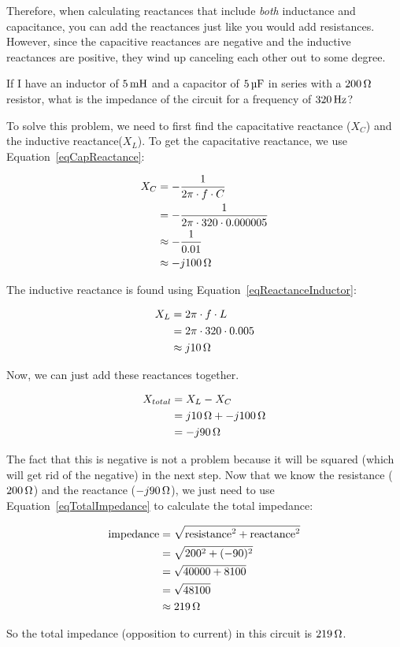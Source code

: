 Therefore, when calculating reactances that include \emph{both} inductance and capacitance, you can add the reactances just like you would add resistances.
However, since the capacitive reactances are negative and the inductive reactances are positive, they wind up canceling each other out to some degree.

\begin{exampleprob}
If I have an inductor of $5\mymhy$ and a capacitor of $5\,\si{\micro\farad}$ in series with a $200\,\si{\ohm}$ resistor, what is the impedance of the circuit for a frequency of $320\,\si{\hertz}$?

To solve this problem, we need to first find the capacitative reactance ($X_C$) and the inductive reactance($X_L$).
To get the capacitative reactance, we use Equation~\ref{eqCapReactance}:

\begin{align*}
X_C &= -\frac{1}{2\pi\cdot f\cdot C} \\
    &= -\frac{1}{2\pi\cdot 320\cdot 0.000005} \\
    &\approx -\frac{1}{0.01} \\
    &\approx -j100\,\si{\ohm}
\end{align*}

The inductive reactance is found using Equation~\ref{eqReactanceInductor}:

\begin{align*}
X_L &= 2\pi\cdot f\cdot L \\
    &= 2\pi\cdot 320 \cdot 0.005 \\
    &\approx j10\,\si{\ohm}
\end{align*}

Now, we can just add these reactances together.

\begin{align*}
X_{total} &= X_L - X_C \\
 &= j10\,\si{\ohm} + -j100\,\si{\ohm} \\
 &= -j90\,\si{\ohm}
\end{align*}

The fact that this is negative is not a problem because it will be squared (which will get rid of the negative) in the next step.
Now that we know the resistance ($200\,\si{\ohm}$) and the reactance ($-j90\,\si{\ohm}$), we just need to use Equation~\ref{eqTotalImpedance} to calculate the total impedance:

\begin{align*}
\textrm{impedance} &= \sqrt{\textrm{resistance}^2 + \textrm{reactance}^2} \\ 
  &= \sqrt{200^2 + (-90)^2} \\
  &= \sqrt{40000 + 8100} \\
  &= \sqrt{48100} \\
  &\approx 219\,\si{\ohm}
\end{align*}

So the total impedance (opposition to current) in this circuit is $219\,\si{\ohm}$.
\end{exampleprob}


